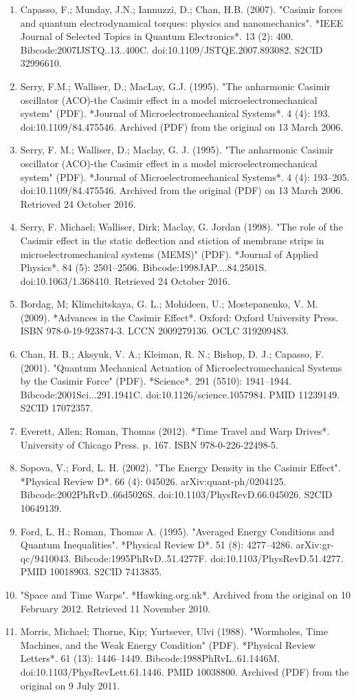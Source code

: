\begin{enumerate}
\item Capasso, F.; Munday, J.N.; Iannuzzi, D.; Chan, H.B. (2007). "Casimir forces and quantum electrodynamical torques: physics and nanomechanics". *IEEE Journal of Selected Topics in Quantum Electronics*. 13 (2): 400. Bibcode:2007IJSTQ..13..400C. doi:10.1109/JSTQE.2007.893082. S2CID 32996610.
\item Serry, F.M.; Walliser, D.; MacLay, G.J. (1995). "The anharmonic Casimir oscillator (ACO)-the Casimir effect in a model microelectromechanical system" (PDF). *Journal of Microelectromechanical Systems*. 4 (4): 193. doi:10.1109/84.475546. Archived (PDF) from the original on 13 March 2006.
\item Serry, F. M.; Walliser, D.; Maclay, G. J. (1995). "The anharmonic Casimir oscillator (ACO)-the Casimir effect in a model microelectromechanical system" (PDF). *Journal of Microelectromechanical Systems*. 4 (4): 193–205. doi:10.1109/84.475546. Archived from the original (PDF) on 13 March 2006. Retrieved 24 October 2016.
\item Serry, F. Michael; Walliser, Dirk; Maclay, G. Jordan (1998). "The role of the Casimir effect in the static deflection and stiction of membrane strips in microelectromechanical systems (MEMS)" (PDF). *Journal of Applied Physics*. 84 (5): 2501–2506. Bibcode:1998JAP....84.2501S. doi:10.1063/1.368410. Retrieved 24 October 2016.
\item Bordag, M; Klimchitskaya, G. L.; Mohideen, U.; Mostepanenko, V. M. (2009). *Advances in the Casimir Effect*. Oxford: Oxford University Press. ISBN 978-0-19-923874-3. LCCN 2009279136. OCLC 319209483.
\item Chan, H. B.; Aksyuk, V. A.; Kleiman, R. N.; Bishop, D. J.; Capasso, F. (2001). "Quantum Mechanical Actuation of Microelectromechanical Systems by the Casimir Force" (PDF). *Science*. 291 (5510): 1941–1944. Bibcode:2001Sci...291.1941C. doi:10.1126/science.1057984. PMID 11239149. S2CID 17072357.
\item Everett, Allen; Roman, Thomas (2012). *Time Travel and Warp Drives*. University of Chicago Press. p. 167. ISBN 978-0-226-22498-5.
\item Sopova, V.; Ford, L. H. (2002). "The Energy Density in the Casimir Effect". *Physical Review D*. 66 (4): 045026. arXiv:quant-ph/0204125. Bibcode:2002PhRvD..66d5026S. doi:10.1103/PhysRevD.66.045026. S2CID 10649139.
\item Ford, L. H.; Roman, Thomas A. (1995). "Averaged Energy Conditions and Quantum Inequalities". *Physical Review D*. 51 (8): 4277–4286. arXiv:gr-qc/9410043. Bibcode:1995PhRvD..51.4277F. doi:10.1103/PhysRevD.51.4277. PMID 10018903. S2CID 7413835.
\item "Space and Time Warps". *Hawking.org.uk*. Archived from the original on 10 February 2012. Retrieved 11 November 2010.
\item Morris, Michael; Thorne, Kip; Yurtsever, Ulvi (1988). "Wormholes, Time Machines, and the Weak Energy Condition" (PDF). *Physical Review Letters*. 61 (13): 1446–1449. Bibcode:1988PhRvL..61.1446M. doi:10.1103/PhysRevLett.61.1446. PMID 10038800. Archived (PDF) from the original on 9 July 2011.
\end{enumerate}
